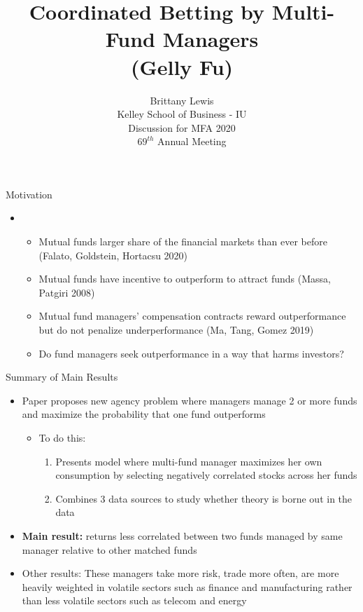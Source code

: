 \documentclass[12pt, aspectratio = 169%
]{beamer}
\title{\Large\textbf{%
	Coordinated Betting by Multi-Fund Managers \\
	\large (Gelly Fu)
%
}}
\author{\Large
	Brittany Lewis \\
	Kelley School of Business - IU\\
	\vspace{2em}
	\small Discussion for MFA 2020 \\
	\small $69^{th}$ Annual Meeting
}
\newcommand{\1}{{\mathbbm{1}}}
\begin{document}
{
\begin{frame}
	\titlepage
\end{frame}
}
\addtocounter{framenumber}{-1}

\begin{frame}{Motivation}
\begin{itemize}
	\item
	\begin{itemize} \itemsep3.5ex
		\item Mutual funds larger share of the financial markets than ever before (Falato, Goldstein, 			Hortacsu 2020)
		\item Mutual funds have incentive to outperform to attract funds (Massa, Patgiri 2008)
		\item Mutual fund managers' compensation contracts reward outperformance but do not penalize underperformance (Ma, Tang, Gomez 2019)
		\item Do fund managers seek outperformance in a way that harms investors?
	\end{itemize}
\end{itemize}
\end{frame}

\begin{frame}{Summary of Main Results}
\begin{itemize} \itemsep2ex
		\item Paper proposes new agency problem where managers manage 2 or more funds and 				maximize the probability that one fund outperforms 
			\begin{itemize}
				\item To do this:
					\begin{enumerate}
						\item Presents model where multi-fund manager maximizes her own 								consumption by selecting negatively correlated stocks across her funds 
						\item Combines 3 data sources to study whether theory is borne out in the 							data
					\end{enumerate}
			\end{itemize}
		\item \textbf{Main result:} returns less correlated between two funds managed by same manager relative 			to other matched funds
		\item Other results: These managers take more risk, trade more often, are more heavily weighted 			in volatile sectors such as finance and manufacturing rather than less volatile sectors such 			as telecom and energy
\end{itemize}
\end{frame}
\end{document}
